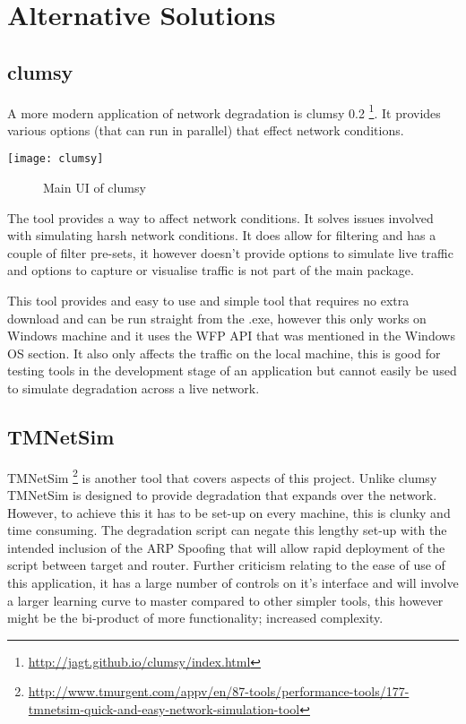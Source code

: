 \section{Alternative Solutions}
\subsection{clumsy}
A more modern application of network degradation is clumsy 0.2 \footnote{\url{http://jagt.github.io/clumsy/index.html}}. It provides various options (that can run in parallel) that effect network conditions. 

\begin{center}
	\texttt{[image: clumsy]}
	\begin{figure}[h]
		\caption{Main UI of clumsy}
	\end{figure}
\end{center}

The tool provides a way to affect network conditions. It solves issues involved with simulating harsh network conditions. It does allow for filtering and has a couple of filter pre-sets, it however doesn't provide options to simulate live traffic and options to capture or visualise traffic is not part of the main package.

This tool provides and easy to use and simple tool that requires no extra download and can be run straight from the .exe, however this only works on Windows machine and it uses the WFP API that was mentioned in the Windows OS section. It also only affects the traffic on the local machine, this is good for testing tools in the development stage of an application but cannot easily be used to simulate degradation across a live network.

\subsection{TMNetSim}
TMNetSim \footnote{\url{http://www.tmurgent.com/appv/en/87-tools/performance-tools/177-tmnetsim-quick-and-easy-network-simulation-tool}} is another tool that covers aspects of this project. Unlike clumsy TMNetSim is designed to provide degradation that expands over the network. However, to achieve this it has to be set-up on every machine, this is clunky and time consuming. The degradation script can negate this lengthy set-up with the intended inclusion of the ARP Spoofing that will allow rapid deployment of the script between target and router. Further criticism relating to the ease of use of this application, it has a large number of controls on it's interface and will involve a larger learning curve to master compared to other simpler tools, this however might be the bi-product of more functionality; increased complexity.

